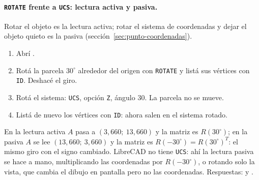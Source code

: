 \paragraph{\texttt{ROTATE} frente a \texttt{UCS}: lectura activa y pasiva.} Rotar el objeto es
la lectura activa; rotar el sistema de coordenadas y dejar el objeto quieto es la pasiva
(sección~\ref{sec:punto-coordenadas}).
\begin{enumerate}
  \item Abrí .
  \item Rotá la parcela \(30^\circ\) alrededor del origen con \texttt{ROTATE} y listá sus
  vértices con \texttt{ID}. Deshacé el giro.
  \item Rotá el sistema: \texttt{UCS}, opción \texttt{Z}, ángulo \(30\). La parcela no se mueve.
  \item Listá de nuevo los vértices con \texttt{ID}: ahora salen en el sistema rotado.
\end{enumerate}
En la lectura activa \(A\) pasa a \((3{,}660;\ 13{,}660)\) y la matriz es \(R(30^\circ)\); en
la pasiva \(A\) se lee \((13{,}660;\ 3{,}660)\) y la matriz es
\(R(-30^\circ)=R(30^\circ)^T\): el mismo giro con el signo cambiado. LibreCAD no tiene
\texttt{UCS}: ahí la lectura pasiva se hace a mano, multiplicando las coordenadas por
\(R(-30^\circ)\), o rotando solo la vista, que cambia el dibujo en pantalla pero no las
coordenadas. Respuestas:  y
.

